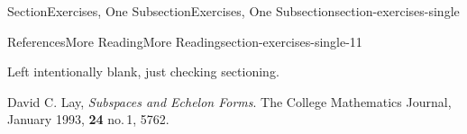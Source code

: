 \documentclass[twoside,10pt,]{article}
\numberwithin{equation}{section}
\begin{document}
\begin{sectionptx}{Section}{Exercises, One Subsection}{}{Exercises, One Subsection}{}{}{section-exercises-single}
\begin{references-subsection-numberless}{References}{More Reading}{}{More Reading}{}{}{section-exercises-single-11}
\begin{introduction}{}%
Left intentionally blank, just checking sectioning.%
\end{introduction}%
\begin{referencelist}
\hypertarget{biblio-lay-article-repeat2}{}David C. Lay, \textit{Subspaces and Echelon Forms}. The College Mathematics Journal, January 1993, \textbf{24} no.\@\,1, 57\textendash{}62.
\end{referencelist}
\end{references-subsection-numberless}
\end{sectionptx}
%
%
\typeout{************************************************}
\typeout{************************************************}
%
\end{document}
